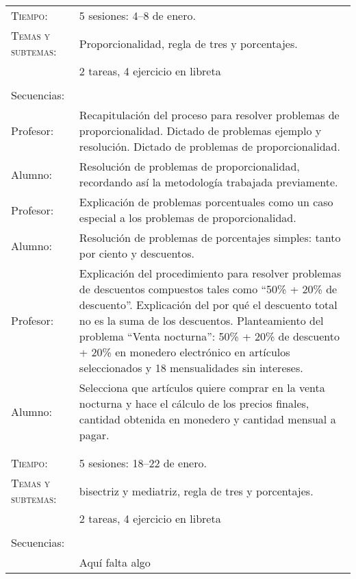 \documentclass[letterpaper,10pt]{article}
\begin{document}
\begin{tabular}[t]{R{0.25\textwidth}p{0.71\textwidth}}
    \textsc{Tiempo:}          & 5 sesiones: 4--8  de enero. \\
    \textsc{Temas y subtemas:}& Proporcionalidad, regla de tres y porcentajes.\\
    & 2 tareas, 4 ejercicio en libreta\\ \\
    \large{\sc Secuencias:} \\
    
    Profesor:   & Recapitulaci\'on del proceso para resolver problemas de
    proporcionalidad. Dictado de problemas ejemplo y resoluci\'on. Dictado de
    problemas de proporcionalidad.\\    
    Alumno:     & Resoluci\'on de problemas de proporcionalidad, recordando
    as\'i la metodolog\'ia trabajada previamente.  \\
    Profesor:   & Explicaci\'on de problemas porcentuales como un caso especial
    a los problemas de proporcionalidad. \\    
    Alumno:     & Resoluci\'on de problemas de porcentajes simples: tanto por
    ciento y descuentos. \\    
    Profesor:   & Explicaci\'on del procedimiento para resolver problemas de
    descuentos compuestos tales como ``50\% + 20\% de descuento''. Explicaci\'on
    del por qu\'e el descuento total no es la suma de los descuentos.
    Planteamiento del problema ``Venta nocturna'': 50\% + 20\% de descuento +
    20\% en monedero electr\'onico en art\'iculos seleccionados y 18
    mensualidades sin intereses. \\ Alumno:     & Selecciona que art\'iculos
    quiere comprar en la venta nocturna y hace el c\'alculo de los precios
    finales, cantidad obtenida en monedero y cantidad mensual a pagar. \\
\\ \hline \\
    \textsc{Tiempo:}           & 5 sesiones: 18--22  de enero. \\
    \textsc{Temas y subtemas:} & bisectriz y mediatriz, regla de tres y porcentajes.\\
     & 2 tareas, 4 ejercicio en libreta\\ \\
    \large{\sc Secuencias:} \\

                    & {\Huge Aqu\'i falta algo}
\end{tabular}
\end{document}
